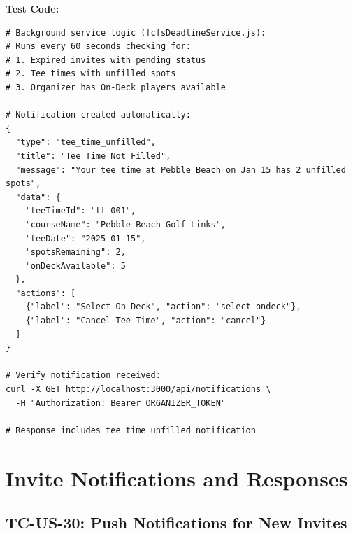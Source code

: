 \documentclass[11pt,a4paper]{article}
\begin{document}
\vspace{0.3cm}
\textbf{Test Code:}
\begin{lstlisting}
# Background service logic (fcfsDeadlineService.js):
# Runs every 60 seconds checking for:
# 1. Expired invites with pending status
# 2. Tee times with unfilled spots
# 3. Organizer has On-Deck players available

# Notification created automatically:
{
  "type": "tee_time_unfilled",
  "title": "Tee Time Not Filled",
  "message": "Your tee time at Pebble Beach on Jan 15 has 2 unfilled spots",
  "data": {
    "teeTimeId": "tt-001",
    "courseName": "Pebble Beach Golf Links",
    "teeDate": "2025-01-15",
    "spotsRemaining": 2,
    "onDeckAvailable": 5
  },
  "actions": [
    {"label": "Select On-Deck", "action": "select_ondeck"},
    {"label": "Cancel Tee Time", "action": "cancel"}
  ]
}

# Verify notification received:
curl -X GET http://localhost:3000/api/notifications \
  -H "Authorization: Bearer ORGANIZER_TOKEN"

# Response includes tee_time_unfilled notification
\end{lstlisting}

\newpage


\section{Invite Notifications and Responses}

\subsection{TC-US-30: Push Notifications for New Invites}
\end{document}
